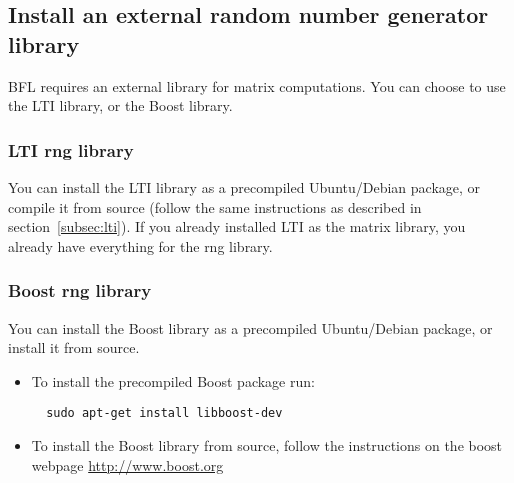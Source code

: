 \documentclass[a4paper,10pt]{article}
\begin{document}
\subsection{Install an external random number generator library}
BFL requires an external library for matrix computations. You can
choose to use the LTI library, or the Boost library.

\subsubsection{LTI rng library}
You can install the LTI library as a precompiled Ubuntu/Debian
package, or compile it from source (follow the same instructions as
described in section~\ref{subsec:lti}). If you already installed LTI
as the matrix library, you already have everything for the rng library.

\subsubsection{Boost rng library}
You can install the Boost library as a precompiled Ubuntu/Debian
package, or install it from source.
\begin{itemize}
\item To install the precompiled Boost package run:
\begin{verbatim}
  sudo apt-get install libboost-dev
\end{verbatim}
\item To install the Boost library from source, follow the
  instructions on the boost webpage \url{http://www.boost.org}
\end{itemize}
\end{document}

